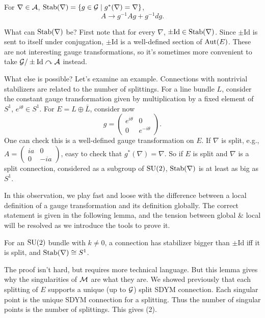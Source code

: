 \documentclass[main]{subfiles}
\begin{document}
\begin{definition}
For $\nabla\in\mathcal{A}$, $\operatorname{Stab}(\nabla) = \{g\in\mathcal{G} \mid g^\ast(\nabla)=\nabla\}$,
\[
A\longrightarrow g^{-1}Ag + g^{-1}dg.
\]
\end{definition}

What can $\operatorname{Stab}(\nabla)$ be? First note that for every $\nabla$, $\pm\mathrm{Id}\in\operatorname{Stab}(\nabla)$. Since $\pm\mathrm{Id}$ is sent to itself under conjugation, $\pm\mathrm{Id}$ is a well-defined section of $\operatorname{Aut}(E)$. These are not interesting gauge transformations, so it's sometimes more convenient to take $\mathcal{G}/\pm\mathrm{Id} \curvearrowright \mathcal{A}$ instead.

What else is possible? Let's examine an example. Connections with nontrivial stabilizers are related to the number of splittings. For a line bundle $L$, consider the constant gauge transformation given by multiplication by a fixed element of $S^1$, $e^{i\theta}\in S^1$. For $E = L\oplus \bar{L}$, consider now
\[
g = \begin{pmatrix} e^{i\theta} & 0 \\ 0 & e^{-i\theta}\end{pmatrix}.
\]
One can check this is a well-defined gauge transformation on $E$. If $\nabla$ is split, e.g., $A = \begin{pmatrix} ia & 0 \\ 0 & -ia\end{pmatrix}$, easy to check that $g^\ast(\nabla)=\nabla$. So if $E$ is split and $\nabla$ is a split connection, considered as a subgroup of $\operatorname{SU}(2)$, $\operatorname{Stab}(\nabla)$ is at least as big as $S^1$.

\begin{remark}
In this observation, we play fast and loose with the difference between a local definition of a gauge transformation and its definition globally. The correct statement is given in the following lemma, and the tension between global \& local will be resolved as we introduce the tools to prove it.
\end{remark}

\begin{lemma}
For an $\operatorname{SU}(2)$ bundle with $k\neq 0$, a connection has stabilizer bigger than $\pm\mathrm{Id}$ iff it is split, and $\operatorname{Stab}(\nabla)\cong S^1$.
\end{lemma}

The proof isn't hard, but requires more technical language. But this lemma gives why the singularities of $\mathcal{M}$ are what they are. We showed previously that each splitting of $E$ supports a unique (up to $\mathcal{G}$) split SDYM connection. Each singular point is the unique SDYM connection for a splitting. Thus the number of singular points is the number of splittings. This gives (2).
\end{document}
